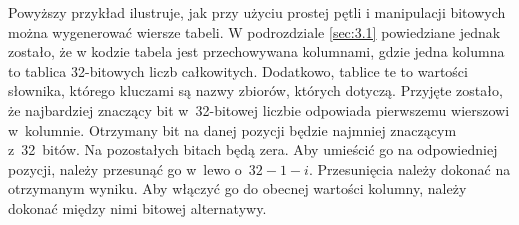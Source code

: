 \documentclass{SGGW-thesis}
\begin{document}
\begin{paragraph}{}
    Powyższy przykład ilustruje, jak przy użyciu prostej pętli i manipulacji bitowych można wygenerować wiersze tabeli. W podrozdziale \ref{sec:3.1} powiedziane jednak zostało, że w kodzie tabela jest przechowywana kolumnami, gdzie jedna kolumna to tablica 32-bitowych liczb całkowitych. Dodatkowo, tablice te to wartości słownika, którego kluczami są nazwy zbiorów, których dotyczą. Przyjęte zostało, że najbardziej znaczący bit w~32-bitowej liczbie odpowiada pierwszemu wierszowi w~kolumnie. Otrzymany bit na danej pozycji będzie najmniej znaczącym z~32~bitów. Na pozostałych bitach będą zera. Aby umieścić go na odpowiedniej pozycji, należy przesunąć go w~lewo o~$32 - 1 - i$. Przesunięcia należy dokonać na otrzymanym wyniku. Aby włączyć go do obecnej wartości kolumny, należy dokonać między nimi bitowej alternatywy.
    

\end{paragraph}
\end{document}
